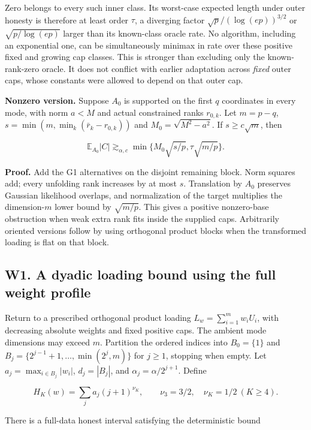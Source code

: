 \documentclass[
  10pt,
]{article}
\begin{document}
Zero belongs to every such inner class. Its worst-case expected length
under outer honesty is therefore at least order \(\tau\), a diverging
factor \(\sqrt p/(\log(ep))^{3/2}\) or \(\sqrt{p/\log(ep)}\) larger than
its known-class oracle rate. No algorithm, including an exponential one,
can be simultaneously minimax in rate over these positive fixed and
growing cap classes. This is stronger than excluding only the
known-rank-zero oracle. It does not conflict with earlier adaptation
across \emph{fixed} outer caps, whose constants were allowed to depend
on that outer cap.

\textbf{Nonzero version.} Suppose \(A_0\) is supported on the first
\(q\) coordinates in every mode, with norm \(a<M\) and actual
constrained ranks \(r_{0,k}\). Let \(m=p-q\),
\(s=\min(m,\min_k(\bar r_k-r_{0,k}))\) and \(M_0=\sqrt{M^2-a^2}\). If
\(s\ge c\sqrt m\), then

\[\mathbb E_{A_0}|C|\gtrsim_{\alpha,c}
\min\{M_0\sqrt{s/p},\tau\sqrt{m/p}\}.\]

\textbf{Proof.} Add the G1 alternatives on the disjoint remaining block.
Norm squares add; every unfolding rank increases by at most \(s\).
Translation by \(A_0\) preserves Gaussian likelihood overlaps, and
normalization of the target multiplies the dimension-\(m\) lower bound
by \(\sqrt{m/p}\). This gives a positive nonzero-base obstruction when
weak extra rank fits inside the supplied caps. Arbitrarily oriented
versions follow by using orthogonal product blocks when the transformed
loading is flat on that block.

\subsection{W1. A dyadic loading bound using the full weight
profile}\label{w1.-a-dyadic-loading-bound-using-the-full-weight-profile}

Return to a prescribed orthogonal product loading
\(L_w=\sum_{i=1}^m w_i U_i\), with decreasing absolute weights and fixed
positive caps. The ambient mode dimensions may exceed \(m\). Partition
the ordered indices into \(B_0=\{1\}\) and
\(B_j=\{2^{j-1}+1,\ldots,\min(2^j,m)\}\) for \(j\ge1\), stopping when
empty. Let \(a_j=\max_{i\in B_j}|w_i|\), \(d_j=|B_j|\), and
\(\alpha_j=\alpha/2^{j+1}\). Define

\[H_K(w)=\sum_j a_j(j+1)^{\nu_K},\qquad
\nu_3=3/2,\quad \nu_K=1/2\ (K\ge4).\]

There is a full-data honest interval satisfying the deterministic bound
\end{document}
